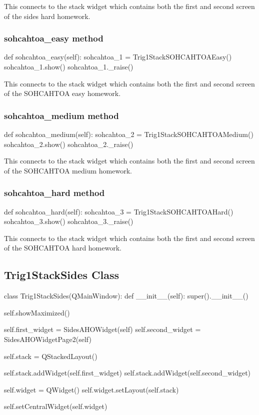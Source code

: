 This connects to the stack widget which contains both the first and second screen of the sides hard homework.

\subsubsection{sohcahtoa\_easy method}

\begin{python}
def sohcahtoa_easy(self):
        sohcahtoa_1 = Trig1StackSOHCAHTOAEasy()
        sohcahtoa_1.show()
        sohcahtoa_1._raise()
\end{python}

This connects to the stack widget which contains both the first and second screen of the SOHCAHTOA easy homework.

\subsubsection{sohcahtoa\_medium method}

\begin{python}
def sohcahtoa_medium(self):
        sohcahtoa_2 = Trig1StackSOHCAHTOAMedium()
        sohcahtoa_2.show()
        sohcahtoa_2._raise()
\end{python}

This connects to the stack widget which contains both the first and second screen of the SOHCAHTOA medium homework.

\subsubsection{sohcahtoa\_hard method}

\begin{python}
def sohcahtoa_hard(self):
        sohcahtoa_3 = Trig1StackSOHCAHTOAHard()
        sohcahtoa_3.show()
        sohcahtoa_3._raise()
\end{python}

This connects to the stack widget which contains both the first and second screen of the SOHCAHTOA hard homework.

\subsection{Trig1StackSides Class}

\begin{python}
class Trig1StackSides(QMainWindow):
    def __init__(self):
        super().__init__()

        self.showMaximized()

        self.first_widget = SidesAHOWidget(self)
        self.second_widget = SidesAHOWidgetPage2(self)

        self.stack = QStackedLayout()

        self.stack.addWidget(self.first_widget)
        self.stack.addWidget(self.second_widget)

        self.widget = QWidget()
        self.widget.setLayout(self.stack)

        self.setCentralWidget(self.widget)
\end{python}

